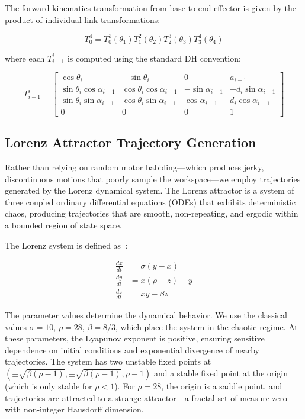 \documentclass[12pt,a4paper,oneside]{report}
\begin{document}
The forward kinematics transformation from base to end-effector is given by the product of individual link transformations:

\begin{equation}
T_{0}^{4} = T_{0}^{1}(\theta_1) T_{1}^{2}(\theta_2) T_{2}^{3}(\theta_3) T_{3}^{4}(\theta_4)
\end{equation}

where each $T_{i-1}^{i}$ is computed using the standard DH convention:

\begin{equation}
T_{i-1}^{i} = 
\begin{bmatrix}
\cos\theta_i & -\sin\theta_i & 0 & a_{i-1} \\
\sin\theta_i \cos\alpha_{i-1} & \cos\theta_i \cos\alpha_{i-1} & -\sin\alpha_{i-1} & -d_i \sin\alpha_{i-1} \\
\sin\theta_i \sin\alpha_{i-1} & \cos\theta_i \sin\alpha_{i-1} & \cos\alpha_{i-1} & d_i \cos\alpha_{i-1} \\
0 & 0 & 0 & 1
\end{bmatrix}
\end{equation}

\subsection{Lorenz Attractor Trajectory Generation}
\label{subsec:lorenz_attractor_trajectory_generation}

Rather than relying on random motor babbling—which produces jerky, discontinuous motions that poorly sample the workspace—we employ trajectories generated by the Lorenz dynamical system. The Lorenz attractor is a system of three coupled ordinary differential equations (ODEs) that exhibits deterministic chaos, producing trajectories that are smooth, non-repeating, and ergodic within a bounded region of state space.

The Lorenz system is defined as~\cite{lorenz1963}:

\begin{align}
\frac{dx}{dt} &= \sigma(y - x) \\
\frac{dy}{dt} &= x(\rho - z) - y \\
\frac{dz}{dt} &= xy - \beta z
\end{align}

The parameter values determine the dynamical behavior. We use the classical values $\sigma = 10$, $\rho = 28$, $\beta = 8/3$, which place the system in the chaotic regime. At these parameters, the Lyapunov exponent is positive, ensuring sensitive dependence on initial conditions and exponential divergence of nearby trajectories. The system has two unstable fixed points at $(\pm\sqrt{\beta(\rho-1)}, \pm\sqrt{\beta(\rho-1)}, \rho-1)$ and a stable fixed point at the origin (which is only stable for $\rho < 1$). For $\rho = 28$, the origin is a saddle point, and trajectories are attracted to a strange attractor—a fractal set of measure zero with non-integer Hausdorff dimension.
\end{document}
